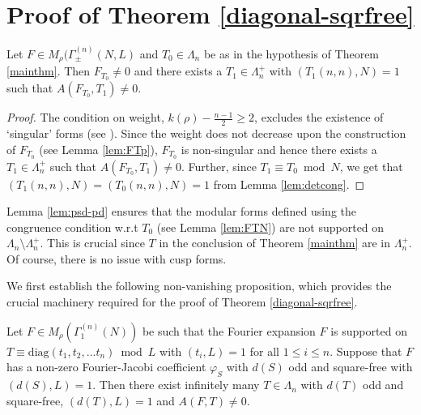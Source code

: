 \documentclass[11pt]{amsart}
\numberwithin{equation}{section}
\newcommand{\mrm}{\mathrm} %
\newcommand{\Mrho}[2]{M_\rho(\Gamma_\pm^{(#1)}(#2, L)}
\begin{document}
\section{Proof of Theorem \ref{diagonal-sqrfree}}\label{sec:thmdiag}

\begin{lemma}\label{lem:psd-pd}
    Let $F \in \Mrho{n}{N}$ and $T_0\in \Lambda_n$ be as in the hypothesis of Theorem \ref{mainthm}. Then $F_{T_0}\neq 0$ and there exists a $T_1\in \Lambda_n^+$ with $(T_1(n,n),N)=1$ such that $A(F_{T_0}, T_1)\neq 0$.
\end{lemma}
\begin{proof}
The condition on weight,  $k(\rho) - \frac{n-1}{2} \ge 2 $, excludes the existence of `singular' forms (see \cite{weissauer1983vektorwertige}). Since the weight does not decrease upon the construction of $F_{T_0}$ (see Lemma \ref{lem:FTp}), $F_{T_0}$ is non-singular and hence there exists a $T_1\in \Lambda^+_n$ such that $A(F_{T_0}, T_1)\neq 0$. Further, since $T_1\equiv T_0 \bmod N$, we get that $(T_1(n,n), N)=(T_0(n,n),N)=1$ from Lemma \ref{lem:detcong}.
\end{proof}

\begin{remark}\label{rmk:psd-pd}
Lemma \ref{lem:psd-pd} ensures that the modular forms defined using the congruence condition w.r.t $T_0$ (see Lemma \ref{lem:FTN}) are not supported on $\Lambda_n \setminus
\Lambda^+_n$. This is crucial since $T$ in the conclusion of Theorem \ref{mainthm} are in $\Lambda^+_n$. Of course, there is no issue with cusp forms.
\end{remark}
We first establish the following non-vanishing proposition, which provides the crucial machinery required for the proof of Theorem \ref{diagonal-sqrfree}.
\begin{proposition}\label{alldiag-fund-prop}
Let $F\in M_\rho(\Gamma_1^{(n)}(N))$ be such that the Fourier expansion $F$ is supported on $T\equiv \mrm{diag}(t_1, t_2,...t_n)\bmod L$ with $(t_i, L)=1$ for all $1\le i\le n$. Suppose that $F$ has a non-zero Fourier-Jacobi coefficient $\varphi_S$  with $d(S)$ odd and square-free with $(d(S), L)=1$. Then there exist infinitely many $T\in \Lambda_n$ with $d(T)$ odd and square-free, $(d(T), L)=1$ and $A(F, T)\neq 0$.
\end{proposition}
\end{document}
